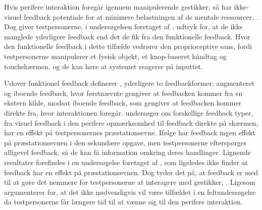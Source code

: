 Hvis perifere interaktion foregår igennem manipulerende gestikker, så har ikke-visuel feedback potentiale for at minimere belastningen af de mentale ressourcer, \parencite[s. 3]{PDF:FacilitatingPIDesignAndEvaluation}. Dog giver testpersonerne, i undersøgelsen foretaget af \textcite[s. 173]{PDF:ComparingInputModalities}, udtryk for, at de ikke manglede yderligere feedback end det de fik fra den funktionelle feedback. Hvor den funktionelle feedback i dette tilfælde vedrører den proprioceptive sans, fordi testpersonerne manipulerer et fysisk objekt, et knop-baseret håndtag og touchskærmen, og de kan høre at systemet reagerer på inputtet.

Udover funktionel feedback definerer \textcite[s. 3]{PDF:InteractionFrogger}, yderligere to feedbackformer; augmenteret og iboende feedback, hvor førstnævnte gengiver at feedbacken kommer fra en ekstern kilde, modsat iboende feedback, som gengiver at feedbacken kommer direkte fra, hvor interaktionen foregår. \blankline
%
\textcite[ss. 1263-1268]{PDF:ComparingModFeedback} undersøger om forskellige feedback typer, fra visuel feedback i den perifere opmærksomhed til feedback direkte på skærmen, har en effekt på testpersonernes præstationsevne. Ifølge \textcite[ss. 1267-1268]{PDF:ComparingModFeedback} har feedback ingen effekt på præstationsevnen i den sekundære opgave, men testpersonerne efterspørger alligevel feedback, så de kan få information omkring deres handlinger. Lignende resultater forefindes i en undersøgelse foretaget af \textcite[s. 8]{PDF:DoThatThere}, som ligeledes ikke finder at feedback har en effekt på præstationsevnen. Dog tyder det på, at feedback er med til at gøre det nemmere for testpersonerne at interagere med gestikker, \parencite[s. 8]{PDF:DoThatThere}. Ligesom \textcite[s. 174]{PDF:ComparingInputModalities} argumenterer \textcite[s. 1268]{PDF:ComparingModFeedback} for, at det ikke nødvendigvis vil være tilfældet i en feltundersøgelse da testpersonerne får længere tid til at vænne sig til den perifere interaktion. 

